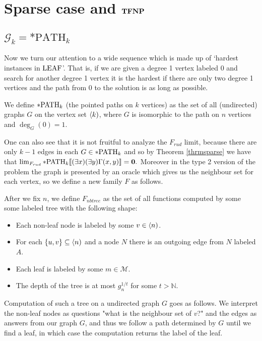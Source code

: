 \chapter{Sparse case and $\textbf{TFNP}$}\label{chapsparse}

\section{$\mathcal{G}_k=*\text{PATH}_k$}

Now we turn our attention to a wide sequence which is made up of `hardest instances in $\text{LEAF}$'. That is, if we are given a degree 1 vertex labeled $0$ and search for another degree 1 vertex it is the hardest if there are only two degree 1 vertices and the path from $0$ to the solution is as long as possible.

\begin{defi}
We define $*\text{PATH}_k$ (the pointed paths on $k$ vertices) as the set of all (undirected) graphs $G$ on the vertex set $\langle k)$, where $G$ is isomorphic to the path on $n$ vertices and $\deg_G(0)=1$.
\end{defi}

One can also see that it is not fruitful to analyze the $F_{rud}$ limit, because there are only $k-1$ edges in each $G\in*\text{PATH}_k$ and so by Theorem \ref{thrmsparse} we have that $\lim_{F_{rud}}*\text{PATH}_k\llbracket(\exists x)(\exists y)\Gamma(x,y)\rrbracket=\textbf{0}.$ Moreover in the type 2 version of the problem the graph is presented by an oracle which gives us the neighbour set for each vertex, so we define a new family $F$ as follows.

\begin{defi}
After we fix $n$, we define $F_{nbtree}$ as the set of all functions computed by some some labeled tree with the following shape:

\begin{itemize}
\item Each non-leaf node is labeled by some $v\in\langle n)$. 
\item For each $\{u,v\} \subseteq \langle n)$ and a node $N$ there is an outgoing edge from $N$ labeled $A$.
\item Each leaf is labeled by some $m\in \mathcal{M}$.
\item The depth of the tree is at most $g_n^{1/t}$ for some $t>\mathbb{N}$.
\end{itemize}

Computation of such a tree on a undirected graph $G$ goes as follows. We interpret the non-leaf nodes as questions "what is the neighbour set of $v$?" and the edges as answers from our graph $G$, and thus we follow a path determined by $G$ until we find a leaf, in which case the computation returns the label of the leaf.
\end{defi}

